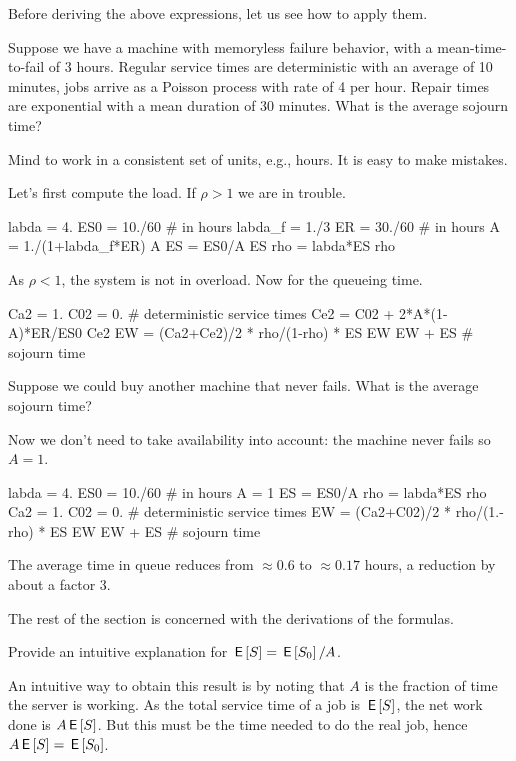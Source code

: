 Before deriving the above expressions, let us see how to apply them. 

\begin{exercise}
 Suppose we have a machine with memoryless failure behavior, with a mean-time-to-fail of $3$ hours. Regular service times are deterministic with an average of 10 minutes, jobs arrive as a Poisson process with rate of 4 per hour. Repair times are exponential with a mean duration of 30 minutes. What is the average sojourn time?
\begin{hint}
 Mind to work in a consistent set of units, e.g., hours. It is easy to make mistakes. 
\end{hint}
\begin{solution}
Let's first compute the load. If $\rho>1$ we are in trouble.
\begin{pyconsole}
labda = 4.
ES0 = 10./60 # in hours
labda_f = 1./3
ER = 30./60 # in hours
A = 1./(1+labda_f*ER)
A
ES = ES0/A
ES
rho = labda*ES
rho
\end{pyconsole}
As $\rho<1$, the system is not in overload. Now for the queueing time.
\begin{pyconsole}
Ca2 = 1.
C02 = 0. # deterministic service times
Ce2 = C02 + 2*A*(1-A)*ER/ES0
Ce2
EW = (Ca2+Ce2)/2 * rho/(1-rho) * ES
EW
EW + ES # sojourn time
\end{pyconsole}
\end{solution}
\end{exercise}

\begin{extra}
 Suppose we could buy another machine that never fails. What is the average sojourn time?
\begin{solution}
Now we don't need to take availability into account: the machine never fails so $A=1$. 
 \begin{pyconsole}
labda = 4.
ES0 = 10./60 # in hours
A = 1
ES = ES0/A
rho = labda*ES
rho
Ca2 = 1.
C02 = 0. # deterministic service times
EW = (Ca2+C02)/2 * rho/(1.-rho) * ES
EW
EW + ES # sojourn time
\end{pyconsole}
The average time in queue reduces from $\approx 0.6$ to $\approx 0.17$ hours, a reduction by about a factor 3. 
\end{solution}
\end{extra}


The rest of the section is concerned with the derivations of the formulas. 


\begin{extra}
 Provide an intuitive explanation for $\,\mathsf{E}\left[S\right] = \,\mathsf{E}\left[S_0\right]/A$.
\begin{solution}
An intuitive way to obtain this result is by noting that $A$ is the fraction of time the server is working. As the total service time of a job is $\,\mathsf{E}\left[S\right]$, the net work done is $ A\,\mathsf{E}\left[S\right]$. But this must be the time needed to do the real job, hence $A \,\mathsf{E}\left[S\right] = \,\mathsf{E}\left[S_0\right]$. 
\end{solution}
\end{extra}




